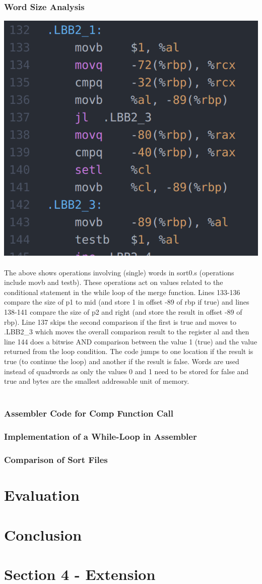 \documentclass[11]{article}
\begin{document}
			\subsubsection{Word Size Analysis}
				\includegraphics[scale=0.3]{WordSize.png} \\\\ The above shows operations involving (single) words in sort0.s (operations include movb and testb). These operations act on values related to the conditional statement in the while loop of  the merge function. Lines 133-136 compare the size of p1 to mid (and store 1 in offset -89 of rbp if true) and lines 138-141 compare the size of p2 and right (and store the result in offset -89 of rbp). Line 137 skips the second comparison if the first is true and moves to .LBB2\_3 which moves the overall comparison result to the register al and then line 144 does a bitwise AND comparison between the value 1 (true) and the value returned from the loop condition. The code jumps to one location if the result is true (to continue the loop) and another if the result is false. Words are used instead of quadwords as only the values 0 and 1 need to be stored for false and true and bytes are the smallest addressable unit of memory. \\\\
			\subsubsection{Assembler Code for Comp Function Call}
			\subsubsection{Implementation of a While-Loop in Assembler}
			\subsubsection{Comparison of Sort Files}
	\section{Evaluation}
	\section{Conclusion}
	\section{Section 4 - Extension}
\end{document}
